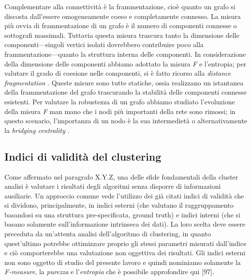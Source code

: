 Complementare alla connettivit\`a \`e la frammentazione, cio\`e quanto un grafo si discosta dall'essere omogeneamente coeso e completamente connesso. La misura pi\`u ovvia di frammentazione di un grafo \`e il numero di componenti connesse o sottografi massimali. Tuttavia questa misura trascura tanto la dimensione delle componenti---singoli vertici isolati dovrebbero contribuire poco alla frammentazione---quanto la struttura interna delle componenti. In considerazione della dimensione delle componenti abbiamo adottato la misura \textit{F} \cite{borgatti_2002} e l'entropia; per valutare il grado di coesione nelle componenti, si \`e fatto ricorso alla \textit{distance fragmentation} \cite{borgatti_2002}. Queste misure sono tutte statiche, ossia realizzano un istantanea della frammentazione del grafo trascurando la stabilit\`a delle componenti connesse esistenti. Per valutare la robustezza di un grafo abbiamo studiato l'evoluzione della misura \textit{F} man mano che i nodi pi\`u importanti della rete sono rimossi; in questo scenario, l'importanza di un nodo \`e la sua intermediet\`a o alternativamente la \textit{bridging centrality} \cite{Hwang_2008}.

\subsection{Indici di validit\`a del clustering}
Come affermato nel paragrafo X.Y.Z, una delle sfide fondamentali della cluster analisi \`e valutare i risultati degli algoritmi senza disporre di informazioni ausiliarie. Un approccio comune vede l'utilizzo dei gi\`a citati indici di validit\`a che si dividono, principalmente, in indici esterni (che valutano il raggruppamento basandosi su una struttura pre-specificata, ground truth) e indici interni (che si basano solamente sull'informazione intrinseca dei dati). La loro scelta deve essere preceduta da un'attenta analisi dell'algoritmo di clustering, in quanto quest'ultimo potrebbe ottimizzare proprio gli stessi parametri misurati dall'indice e ci\`o comporterebbe una valutazione non oggettiva dei risultati. Gli indici esterni non sono oggetto di studio del presente lavoro e quindi nominiamo solamente la \textit{F-measure}, la \textit{purezza} e l'\textit{entropia} che \`e possibile approfondire qui [97]. 

